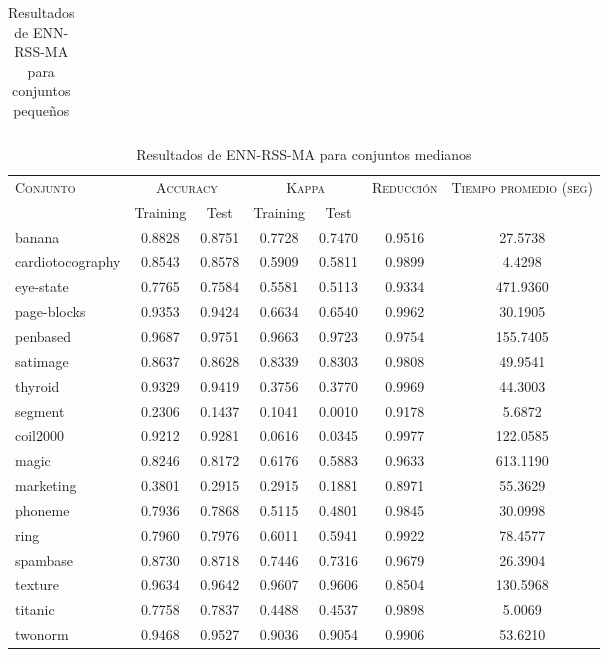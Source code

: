 \begin{table}[]
\begin{tabular}{l c c c c c c}
\hline
\end{tabular}
\caption{Resultados de ENN-RSS-MA para conjuntos pequeños }
\label{res-peq-ENN-RSS-MA}
\end{table}


\begin{table}[]
\centering
\begin{tabular}{l c c c c c c}
\hline
\multirow{2}{*}{\textsc{Conjunto}}
	& \multicolumn{2}{c}{\textsc{Accuracy}}
	& \multicolumn{2}{c}{\textsc{Kappa}}
	& \textsc{Reducción}
	& \textsc{Tiempo promedio (seg)} \\
	& Training & Test
	& Training & Test \\ 
\hline
\hline

banana & 0.8828 & 0.8751 & 0.7728 & 0.7470 & 0.9516 & 27.5738 \\
cardiotocography & 0.8543 & 0.8578 & 0.5909 & 0.5811 & 0.9899 &4.4298 \\
eye-state & 0.7765 & 0.7584 & 0.5581 & 0.5113 & 0.9334 & 471.9360 \\
page-blocks & 0.9353 & 0.9424 & 0.6634 & 0.6540 & 0.9962 & 30.1905 \\
penbased & 0.9687 & 0.9751 & 0.9663 & 0.9723 & 0.9754 & 155.7405 \\
satimage & 0.8637 & 0.8628 & 0.8339 & 0.8303 & 0.9808 & 49.9541 \\
thyroid & 0.9329 & 0.9419 & 0.3756 & 0.3770 & 0.9969 & 44.3003 \\
segment & 0.2306 & 0.1437 & 0.1041 & 0.0010 & 0.9178 &5.6872 \\
coil2000 & 0.9212 & 0.9281 & 0.0616 & 0.0345 & 0.9977 & 122.0585 \\
magic & 0.8246 & 0.8172 & 0.6176 & 0.5883 & 0.9633 & 613.1190 \\
marketing & 0.3801 & 0.2915 & 0.2915 & 0.1881 & 0.8971 & 55.3629 \\
phoneme & 0.7936 & 0.7868 & 0.5115 & 0.4801 & 0.9845 & 30.0998 \\
ring & 0.7960 & 0.7976 & 0.6011 & 0.5941 & 0.9922 & 78.4577 \\
spambase & 0.8730 & 0.8718 & 0.7446 & 0.7316 & 0.9679 & 26.3904 \\
texture & 0.9634 & 0.9642 & 0.9607 & 0.9606 & 0.8504 & 130.5968 \\
titanic & 0.7758 & 0.7837 & 0.4488 & 0.4537 & 0.9898 &5.0069 \\
twonorm & 0.9468 & 0.9527 & 0.9036 & 0.9054 & 0.9906 & 53.6210 \\

\hline
\end{tabular}
\caption{Resultados de ENN-RSS-MA para conjuntos medianos }
\label{res-med-ENN-RSS-MA}
\end{table}


